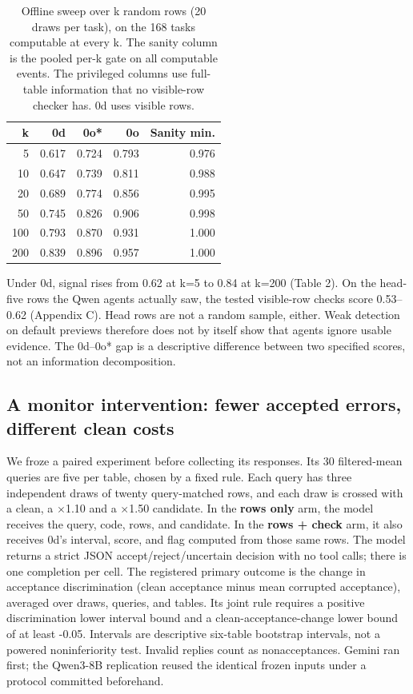 \documentclass[letterpaper]{article}
\begin{document}
\begin{table}[tbp]
\centering
{\small
\setlength{\tabcolsep}{3pt}
\begin{tabular}{rrrrr}
\toprule
k & 0d & 0o* & 0o & Sanity min. \\ \midrule
5 & 0.617 & 0.724 & 0.793 & 0.976 \\
10 & 0.647 & 0.739 & 0.811 & 0.988 \\
20 & 0.689 & 0.774 & 0.856 & 0.995 \\
50 & 0.745 & 0.826 & 0.906 & 0.998 \\
100 & 0.793 & 0.870 & 0.931 & 1.000 \\
200 & 0.839 & 0.896 & 0.957 & 1.000 \\
\bottomrule
\end{tabular}
}

\caption{Offline sweep over k random rows (20 draws per task), on the 168 tasks computable at every k. The sanity column is the pooled per-k gate on all computable events. The privileged columns use full-table information that no visible-row checker has. 0d uses visible rows.}
\label{tab:ksweep}
\end{table}

Under 0d, signal rises from 0.62 at k=5 to 0.84 at k=200 (Table 2). On the head-five rows the Qwen agents actually saw, the tested visible-row checks score 0.53--0.62 (Appendix C). Head rows are not a random sample, either. Weak detection on default previews therefore does not by itself show that agents ignore usable evidence. The 0d--0o* gap is a descriptive difference between two specified scores, not an information decomposition.


\subsection{A monitor intervention: fewer accepted errors, different clean costs}

We froze a paired experiment before collecting its responses. Its 30 filtered-mean queries are five per table, chosen by a fixed rule. Each query has three independent draws of twenty query-matched rows, and each draw is crossed with a clean, a \(\times\)1.10 and a \(\times\)1.50 candidate. In the \textbf{rows only} arm, the model receives the query, code, rows, and candidate. In the \textbf{rows + check} arm, it also receives 0d's interval, score, and flag computed from those same rows. The model returns a strict JSON accept/reject/uncertain decision with no tool calls; there is one completion per cell. The registered primary outcome is the change in acceptance discrimination (clean acceptance minus mean corrupted acceptance), averaged over draws, queries, and tables. Its joint rule requires a positive discrimination lower interval bound and a clean-acceptance-change lower bound of at least -0.05. Intervals are descriptive six-table bootstrap intervals, not a powered noninferiority test. Invalid replies count as nonacceptances. Gemini ran first; the Qwen3-8B replication reused the identical frozen inputs under a protocol committed beforehand.
\end{document}
